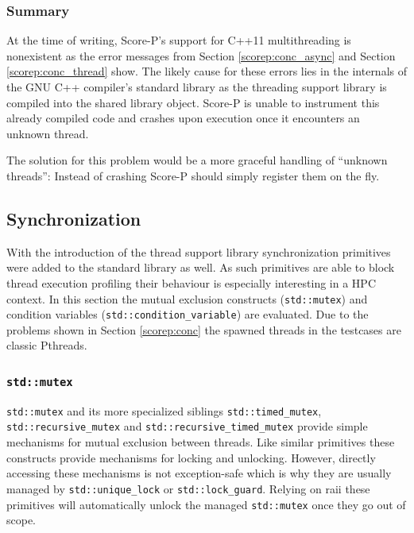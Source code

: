 \subsubsection{Summary}

At the time of writing, Score-P's support for C++11 multithreading is nonexistent as the error messages from Section \ref{scorep:conc_async} and Section \ref{scorep:conc_thread} show. The likely cause for these errors lies in the internals of the GNU C++ compiler's standard library as the threading support library is compiled into the shared library object. Score-P is unable to instrument this already compiled code and crashes upon execution once it encounters an unknown thread.

The solution for this problem would be a more graceful handling of ``unknown threads'': Instead of crashing Score-P should simply register them on the fly.

\subsection{Synchronization}

With the introduction of the thread support library synchronization primitives were added to the standard library as well. As such primitives are able to block thread execution profiling their behaviour is especially interesting in a HPC context. In this section the mutual exclusion constructs (\texttt{std::mutex}) and condition variables (\texttt{std::condition\_variable}) are evaluated. Due to the problems shown in Section \ref{scorep:conc} the spawned threads in the testcases are classic Pthreads.

\subsubsection{\texttt{std::mutex}}\label{scorep:sync_mutex}

\texttt{std::mutex} and its more specialized siblings \texttt{std::timed\_mutex}, \texttt{std::recursive\_mutex} and \texttt{std::recursive\_timed\_mutex} provide simple mechanisms for mutual exclusion between threads. Like similar primitives these constructs provide mechanisms for locking and unlocking. However, directly accessing these mechanisms is not exception-safe which is why they are usually managed by \texttt{std::unique\_lock} or \texttt{std::lock\_guard}. Relying on \gls{raii} these primitives will automatically unlock the managed \texttt{std::mutex} once they go out of scope.

